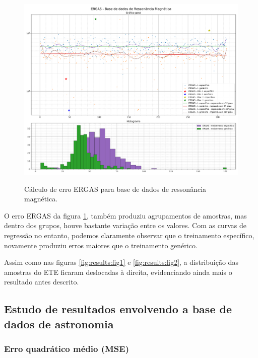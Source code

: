 \begin{figure}[H]
    \centering
    \caption{Cálculo de erro ERGAS para base de dados de ressonância magnética.}
    \includegraphics[width=16cm]{fig/resultados/mri/png/ergas_mri_compound.png}
    \label{fig:results:fig4}
\end{figure}

O erro ERGAS da figura \ref{fig:results:fig4}, também produziu agrupamentos de amostras, mas dentro dos grupos, houve bastante variação entre os valores. Com as curvas de regressão no entanto, podemos claramente observar que o treinamento específico, novamente produziu erros maiores que o treinamento genérico. 

Assim como nas figuras \ref{fig:results:fig1} e \ref{fig:results:fig2}, a distribuição das amostras do ETE ficaram deslocadas à direita, evidenciando ainda mais o resultado antes descrito.

\subsection{Estudo de resultados envolvendo a base de dados de astronomia}
\label{sec:result:astronomy}

\subsubsection{Erro quadrático médio (MSE)}
\label{sec:result:astronomy:mse}

